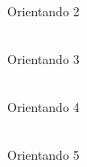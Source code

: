 \documentclass[12pt, a4paper]{article}
\begin{document}
\vspace{0.5cm}

\begin{center}
  \underline{\hspace{7cm}} \\
  Orientando 2
\end{center}

\vspace{0.5cm}

\begin{center}
  \underline{\hspace{7cm}} \\
  Orientando 3
\end{center}

\vspace{0.5cm}

\begin{center}
  \underline{\hspace{7cm}} \\
  Orientando 4
\end{center}

\vspace{0.5cm}

\begin{center}
  \underline{\hspace{7cm}} \\
  Orientando 5
\end{center}
\end{document}
